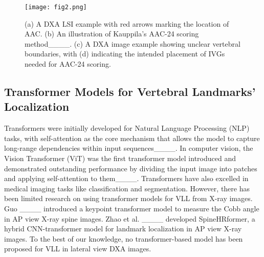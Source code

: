 \begin{figure}[t]
\centerline{\texttt{[image: fig2.png]}}
\caption{(a) A DXA LSI example with red arrows marking the location of AAC. (b) An illustration of Kauppila's AAC-24 scoring method____. (c) A DXA image example showing unclear vertebral boundaries, with (d) indicating the intended placement of IVGs needed for AAC-24 scoring.}
\label{fig2}
\end{figure}

\subsection{Transformer Models for Vertebral Landmarks' Localization}
Transformers were initially developed for Natural Language Processing (NLP) tasks, with self-attention as the core mechanism that allows the model to capture long-range dependencies within input sequences____. In computer vision, the Vision Transformer (ViT) was the first transformer model introduced and demonstrated outstanding performance by dividing the input image into patches and applying self-attention to them____. Transformers have also excelled in medical imaging tasks like classification and segmentation. However, there has been limited research on using transformer models for VLL from X-ray images. Guo ____ introduced a keypoint transformer model to measure the Cobb angle in AP view X-ray spine images. Zhao et al. ____ developed SpineHRformer, a hybrid CNN-transformer model for landmark localization in AP view X-ray images. To the best of our knowledge, no transformer-based model has been proposed for VLL in lateral view DXA images. \par
